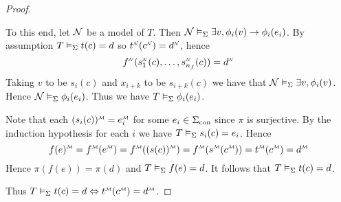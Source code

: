 \begin{proof}
\begin{itemize}
\begin{forward}
            To this end, let $\mathcal{N}$ be a model of $T$.
            Then $\mathcal{N} \vDash_{\Sigma} \exists v, \phi_i(v) \to \phi_i(e_i)$.
            By assumption $T \vDash_{\Sigma} t(c) = d$ so 
            $\nnintp{t}(\nnintp{c}) = \nnintp{d}$,
            hence 
            \[
                \modintp{\NN}{f}(
                    \modintp{\NN}{s_1}(c),\dots,\modintp{\NN}{s_{n_f}}(c)) = 
                \modintp{\NN}{d}
            \]
            Taking $v$ to be $s_i(c)$ and $x_{i+k}$ to be $s_{i+k}(c)$
            we have that 
            $\mathcal{N} \vDash_{\Sigma} \exists v, \phi_i(v)$.
            Hence $\mathcal{N} \vDash_{\Sigma} \phi_i(e_i)$.
            Thus we have $T \vDash_{\Sigma} \phi_i(e_i)$.
        \end{forward}

        \begin{backward} 
            Note that each $\mmintp{(s_i(c))} = \mmintp{e_i}$ 
            for some $e_i \in {\Sigma}_\mathrm{con}$ 
            since $\pi$ is surjective.
            By the induction hypothesis for each $i$ we have 
            $T \vDash_{\Sigma} s_i(c) = e_i$.
            Hence 
            \[
                \mmintp{f(e)}
                = \mmintp{f}(\mmintp{e}) = \mmintp{f}(\mmintp{(s(c))}) 
                = \mmintp{f}(\mmintp{s}(\mmintp{c})) 
                = \mmintp{t}(\mmintp{c}) = \mmintp{d}
            \]
            Hence $\pi(f(e)) = \pi(d)$ and 
            $T \vDash_{\Sigma} f(e) = d$.
            It follows that 
            $T \vDash_{\Sigma} t(c) = d$.
        \end{backward}
    \end{itemize}
    Thus $T \modelsi t(c) = d \iff \mmintp{t}(\mmintp{c}) = \mmintp{d}$.


\end{proof}
